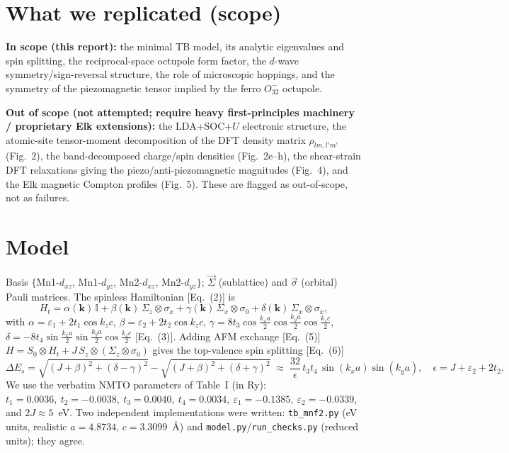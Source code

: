 \documentclass[11pt]{article}
\begin{document}
\section{What we replicated (scope)}
\textbf{In scope (this report):} the minimal TB model, its analytic eigenvalues
and spin splitting, the reciprocal-space octupole form factor, the $d$-wave
symmetry/sign-reversal structure, the role of microscopic hoppings, and the
symmetry of the piezomagnetic tensor implied by the ferro $O_{32}^-$ octupole.

\noindent\textbf{Out of scope (not attempted; require heavy first-principles
machinery / proprietary Elk extensions):} the LDA+SOC+$U$ electronic structure,
the atomic-site tensor-moment decomposition of the DFT density matrix
$\rho_{lm,l'm'}$ (Fig.~2), the band-decomposed charge/spin densities (Fig.~2e--h),
the shear-strain DFT relaxations giving the piezo/anti-piezomagnetic magnitudes
(Fig.~4), and the Elk magnetic Compton profiles (Fig.~5). These are flagged as
out-of-scope, not as failures.

\section{Model}
Basis $\{$Mn1-$d_{xz}$, Mn1-$d_{yz}$, Mn2-$d_{xz}$, Mn2-$d_{yz}\}$;
$\vec\Sigma$ (sublattice) and $\vec\sigma$ (orbital) Pauli matrices. The
spinless Hamiltonian [Eq.~(2)] is
\begin{equation}
H_t=\alpha(\mathbf{k})\,\mathbb{I}+\beta(\mathbf{k})\,\Sigma_z\!\otimes\!\sigma_x
+\gamma(\mathbf{k})\,\Sigma_x\!\otimes\!\sigma_0
+\delta(\mathbf{k})\,\Sigma_x\!\otimes\!\sigma_x ,
\end{equation}
with $\alpha=\varepsilon_1+2t_1\cos k_zc$, $\beta=\varepsilon_2+2t_2\cos k_zc$,
$\gamma=8t_3\cos\frac{k_xa}{2}\cos\frac{k_ya}{2}\cos\frac{k_zc}{2}$,
$\delta=-8t_4\sin\frac{k_xa}{2}\sin\frac{k_ya}{2}\cos\frac{k_zc}{2}$ [Eq.~(3)].
Adding AFM exchange [Eq.~(5)] $H=S_0\otimes H_t+J\,S_z\otimes(\Sigma_z\otimes\sigma_0)$
gives the top-valence spin splitting [Eq.~(6)]
\begin{equation}
\Delta E_s=\sqrt{(J{+}\beta)^2+(\delta{-}\gamma)^2}-\sqrt{(J{+}\beta)^2+(\delta{+}\gamma)^2}
\;\approx\;\frac{32}{\epsilon}\,t_3 t_4\,\sin(k_xa)\sin(k_ya),
\quad \epsilon=J+\varepsilon_2+2t_2 .
\end{equation}
We use the verbatim NMTO parameters of Table~I (in Ry):
$t_1{=}0.0036,\ t_2{=}{-}0.0038,\ t_3{=}0.0040,\ t_4{=}0.0034,\
\varepsilon_1{=}{-}0.1385,\ \varepsilon_2{=}{-}0.0339$, and $2J\approx5$~eV.
Two independent implementations were written: \texttt{tb\_mnf2.py} (eV units,
realistic $a{=}4.8734$, $c{=}3.3099$~\AA) and \texttt{model.py}/\texttt{run\_checks.py}
(reduced units); they agree.
\end{document}
